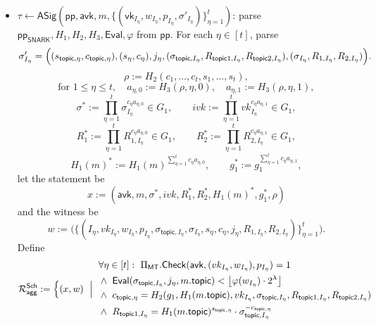 \documentclass{article}
\newcommand{\ppSNARK}[0]{\mathsf{pp}_{\mathsf{SNARK}}}
\newcommand{\pp}[0]{\mathsf{pp}}
\newcommand{\vk}[0]{\mathsf{vk}}
\newcommand{\avk}[0]{\mathsf{avk}}
\newcommand{\topic}[0]{\mathsf{topic}}
\begin{document}
\begin{itemize}
    \item $\tau \leftarrow \mathsf{ASig}(\pp,\avk,m,\{(\vk_{I_\eta},w_{I_\eta},p_{I_\eta},\sigma'_{I_\eta})\}_{\eta=1}^{t})$:
          parse $\ppSNARK,H_1,H_2,H_3,\mathsf{Eval},\varphi$ from $\pp$. For each $\eta\in[t]$, parse
          \[
            \sigma'_{I_\eta}=\Bigl(
              (s_{\topic,\eta},c_{\topic,\eta}),
              (s_\eta,c_\eta),
              j_\eta,
              (\sigma_{\topic,I_\eta},R_{\topic1,I_\eta},R_{\topic2,I_\eta}),
              (\sigma_{I_\eta},R_{1,I_\eta},R_{2,I_\eta})
            \Bigr).
          \]
          \[
            \rho := H_2(c_1,\ldots,c_t,s_1,\ldots,s_t),
          \]
          \[
            \text{for } 1\le \eta \le t,\quad a_{\eta,0}:=H_3(\rho,\eta,0),\quad a_{\eta,1}:=H_3(\rho,\eta,1),
          \]
          \[
            \sigma^* := \prod_{\eta=1}^{t} \sigma_{I_\eta}^{c_\eta a_{\eta,0}} \in G_1,\qquad
            ivk := \prod_{\eta=1}^{t} vk_{I_\eta}^{c_\eta a_{\eta,1}} \in G_1,
          \]
          \[
            R_1^* := \prod_{\eta=1}^{t} R_{1,I_\eta}^{c_\eta a_{\eta,0}} \in G_1,\qquad
            R_2^* := \prod_{\eta=1}^{t} R_{2,I_\eta}^{c_\eta a_{\eta,1}} \in G_1,
          \]
          \[
            H_1(m)^* := H_1(m)^{\sum_{\eta=1}^{t} c_\eta a_{\eta,0}},\qquad
            g_1^* := g_1^{\sum_{\eta=1}^{t} c_\eta a_{\eta,1}},
          \]
          let the statement be
          \[
            x := (\avk,m,\sigma^*,ivk,R_1^*,R_2^*,H_1(m)^*,g_1^*,\rho)
          \]
          and the witness be
          \[
            w := \bigl(\{(I_\eta,vk_{I_\eta},w_{I_\eta},p_{I_\eta},\sigma_{\topic,I_\eta},\sigma_{I_\eta},s_\eta,c_\eta,j_\eta,R_{1,I_\eta},R_{2,I_\eta})\}_{\eta=1}^{t}\bigr).
          \]
          Define
          \begin{equation}\label{R_agg_sch_snark}
          \mathcal{R}^{\mathsf{Sch}}_{\mathsf{agg}}
          :=
          \Bigl\{(x,w)\ \Bigm|\ 
          \begin{aligned}
            &\forall \eta\in[t]:\
            \Pi_{\mathsf{MT}}.\mathsf{Check}(\avk,(vk_{I_\eta},w_{I_\eta}),p_{I_\eta})=1\\
            &\land\ \mathsf{Eval}(\sigma_{\topic,I_\eta},j_\eta,m.\topic) < \bigl\lfloor \varphi(w_{I_\eta})\cdot 2^\lambda\bigr\rfloor\\
            &\land\ c_{\topic,\eta} = H_2(g_1,H_1(m.\topic),vk_{I_\eta},\sigma_{\topic,I_\eta},R_{\topic1,I_\eta},R_{\topic2,I_\eta})\\
            &\land\ R_{\topic1,I_\eta}=H_1(m.\topic)^{s_{\topic,\eta}}\cdot \sigma_{\topic,I_\eta}^{-c_{\topic,\eta}}

\end{aligned}
\end{equation}
\end{itemize}
\end{document}
